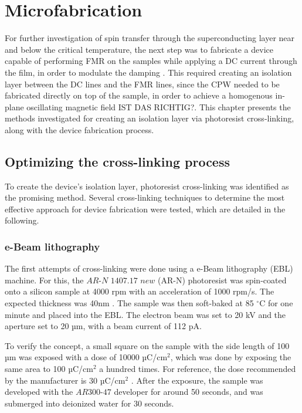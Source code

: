 \chapter{Microfabrication}
\label{ch:Microfabrication}
For further investigation of spin transfer through the superconducting layer near and below the critical temperature, the next step was to fabricate a device capable of performing FMR on the samples while applying a DC current through the film, in order to modulate the damping \cite{IRGENDWAS WAS DC-BIAS macht}. This required creating an isolation layer between the DC lines and the FMR lines, since the CPW needed to be fabricated directly on top of the sample, in order to achieve a homogenous in-plane oscillating magnetic field IST DAS RICHTIG?. This chapter presents the methods investigated for creating an isolation layer via photoresist cross-linking, along with the device fabrication process.

\section{Optimizing the cross-linking process}
To create the device's isolation layer, photoresist cross-linking was identified as the promising method. Several cross-linking techniques to determine the most effective approach for device fabrication were tested, which are detailed in the following.
\subsection{e-Beam lithography}
The first attempts of cross-linking were done using a e-Beam lithography (EBL) machine. For this, the $\textit{AR-N 1407.17 new}$ (AR-N) photoresist was spin-coated onto a silicon sample at 4000 rpm with an acceleration of 1000 rpm/s. The expected thickness was 40nm \cite{Allresist_ARN7520}. The sample was then soft-baked at 85 $^\circ$C for one minute and placed into the EBL. The electron beam was set to 20 kV and the aperture set to 20 µm, with a beam current of 112 pA.

To verify the concept, a small square on the sample with the side length of 100 µm was exposed with a dose of 10000 µC/cm$^2$, which was done by exposing the same area to 100 µC/cm$^2$ a hundred times. For reference, the dose recommended by the manufacturer is 30 µC/cm$^2$ \cite{Allresist_ARN7520}. After the exposure, the sample was developed with the $\textit{AR300-47}$ developer for around 50 seconds, and was submerged into deionized water for 30 seconds.

